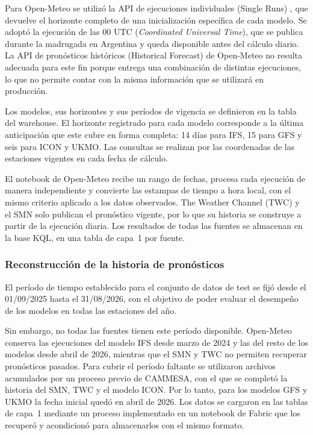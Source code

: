Para Open-Meteo se utilizó la API de ejecuciones individuales (Single Runs) \cite{openMeteoSingleRuns}, que devuelve el horizonte completo de una inicialización específica de cada modelo. Se adoptó la ejecución de las 00 UTC (\textit{Coordinated Universal Time}), que se publica durante la madrugada en Argentina y queda disponible antes del cálculo diario. La API de pronósticos históricos (Historical Forecast) de Open-Meteo \cite{openMeteoHistoricalForecast} no resulta adecuada para este fin porque entrega una combinación de distintas ejecuciones, lo que no permite contar con la misma información que se utilizará en producción. 

Los modelos, sus horizontes y sus períodos de vigencia se definieron en la tabla  del warehouse. El horizonte registrado para cada modelo corresponde a la última anticipación que este cubre en forma completa: 14 días para IFS, 15 para GFS y seis para ICON y UKMO. Las consultas se realizan por las coordenadas de las estaciones vigentes en cada fecha de cálculo. 

El notebook de Open-Meteo recibe un rango de fechas, procesa cada ejecución de manera independiente y convierte las estampas de tiempo a hora local, con el mismo criterio aplicado a los datos observados. The Weather Channel (TWC) y el SMN solo publican el pronóstico vigente, por lo que su historia se construye a partir de la ejecución diaria. Los resultados de todas las fuentes se almacenan en la base KQL, en una tabla de capa~1 por fuente.

\subsubsection{Reconstrucción de la historia de pronósticos}

El período de tiempo establecido para el conjunto de datos de test se fijó desde el 01/09/2025 hasta el 31/08/2026, con el objetivo de poder evaluar el desempeño de los modelos en todas las estaciones del año. 

Sin embargo, no todas las fuentes tienen este período disponible. Open-Meteo conserva las ejecuciones del modelo IFS desde marzo de 2024 y las del resto de los modelos desde abril de 2026, mientras que el SMN y TWC no permiten recuperar pronósticos pasados. Para cubrir el período faltante se utilizaron archivos acumulados por un proceso previo de CAMMESA, con el que se completó la historia del SMN, TWC y el modelo ICON. Por lo tanto, para los modelos GFS y UKMO la fecha inicial quedó en abril de 2026. Los datos se cargaron en las tablas de capa~1 mediante un proceso implementado en un notebook de Fabric que los recuperó y acondicionó para almacenarlos con el mismo formato.

